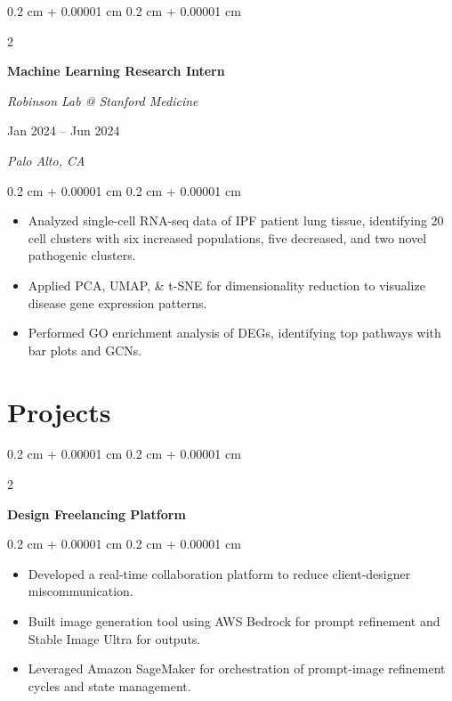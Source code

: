 \documentclass[10pt, letterpaper]{article}
\newenvironment{highlights}{
    \begin{itemize}[
        topsep=0.10 cm,
        parsep=0.10 cm,
        partopsep=0pt,
        itemsep=0pt,
        leftmargin=0.4 cm + 10pt
    ]
}{
    \end{itemize}
} %
\newenvironment{onecolentry}{
    \begin{adjustwidth}{
        0.2 cm + 0.00001 cm
    }{
        0.2 cm + 0.00001 cm
    }
}{
    \end{adjustwidth}
} %
\newenvironment{twocolentry}[2][]{
    \onecolentry
    \def\secondColumn{#2}
    \setcolumnwidth{\fill, 6.5 cm}
    \begin{paracol}{2}
}{
    \switchcolumn \raggedleft \secondColumn
    \end{paracol}
    \endonecolentry
} %
\let\hrefWithoutArrow\href
\renewcommand{\href}[2]{\hrefWithoutArrow{#1}{\ifthenelse{\equal{#2}{}}{ }{#2 }\raisebox{.15ex}{\footnotesize \faExternalLink*}}}
\begin{document}
        \begin{twocolentry}{
        Jan 2024 -- Jun 2024    
            
        \textit{Palo Alto, CA}}
            \textbf{Machine Learning Research Intern}
            
            \textit{Robinson Lab @ Stanford Medicine \href{https://drive.google.com/file/d/1cgRNPQy-6pXMvyiAH8pL8GQbGyIG8JlY/view?usp=sharing}{}}
        \end{twocolentry}

        \vspace{0.10 cm}
        \begin{onecolentry}
            \begin{highlights}
                \item Analyzed single-cell RNA-seq data of IPF patient lung tissue, identifying 20 cell clusters with six increased populations, five decreased, and two novel pathogenic clusters.
                \item Applied PCA, UMAP, \& t-SNE for dimensionality reduction to visualize disease gene expression patterns.
                \item Performed GO enrichment analysis of DEGs, identifying top pathways with bar plots and GCNs.
            \end{highlights}
        \end{onecolentry}

    
    \section{Projects}
        
        \begin{twocolentry}{}
            \textbf{Design Freelancing Platform
            \href{https://github.com/rob-9/echo}{}}
        \end{twocolentry}

        \vspace{0.10 cm}
        \begin{onecolentry}
            \begin{highlights}
                \item Developed a real-time collaboration platform to reduce client-designer miscommunication.
                \item Built image generation tool using AWS Bedrock for prompt refinement and Stable Image Ultra for outputs.
                \item Leveraged Amazon SageMaker for orchestration of prompt-image refinement cycles and state management.
            \end{highlights}
        \end{onecolentry}
\end{document}
